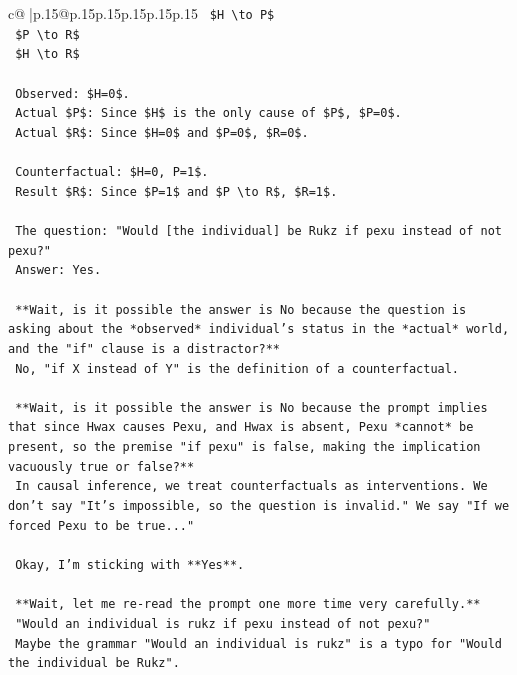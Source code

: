 \documentclass{article}
\begin{document}
{\begin{supertabular}{c@{$\;$}|p{.15\linewidth}@{}p{.15\linewidth}p{.15\linewidth}p{.15\linewidth}p{.15\linewidth}p{.15\linewidth}}
{{{\texttt{    \$H \textbackslash{}to P\$} \\
\texttt{    \$P \textbackslash{}to R\$} \\
\texttt{    \$H \textbackslash{}to R\$} \\
\\ 
\texttt{    Observed: \$H=0\$.} \\
\texttt{    Actual \$P\$: Since \$H\$ is the only cause of \$P\$, \$P=0\$.} \\
\texttt{    Actual \$R\$: Since \$H=0\$ and \$P=0\$, \$R=0\$.} \\
\\ 
\texttt{    Counterfactual: \$H=0, P=1\$.} \\
\texttt{    Result \$R\$: Since \$P=1\$ and \$P \textbackslash{}to R\$, \$R=1\$.} \\
\\ 
\texttt{    The question: "Would {[}the individual{]} be Rukz if pexu instead of not pexu?"} \\
\texttt{    Answer: Yes.} \\
\\ 
\texttt{    **Wait, is it possible the answer is No because the question is asking about the *observed* individual's status in the *actual* world, and the "if" clause is a distractor?**} \\
\texttt{    No, "if X instead of Y" is the definition of a counterfactual.} \\
\\ 
\texttt{    **Wait, is it possible the answer is No because the prompt implies that since Hwax causes Pexu, and Hwax is absent, Pexu *cannot* be present, so the premise "if pexu" is false, making the implication vacuously true or false?**} \\
\texttt{    In causal inference, we treat counterfactuals as interventions. We don't say "It's impossible, so the question is invalid." We say "If we forced Pexu to be true..."} \\
\\ 
\texttt{    Okay, I'm sticking with **Yes**.} \\
\\ 
\texttt{    **Wait, let me re{-}read the prompt one more time very carefully.**} \\
\texttt{    "Would an individual is rukz if pexu instead of not pexu?"} \\
\texttt{    Maybe the grammar "Would an individual is rukz" is a typo for "Would the individual be Rukz".} \\
}}}
\end{supertabular}}
\end{document}
